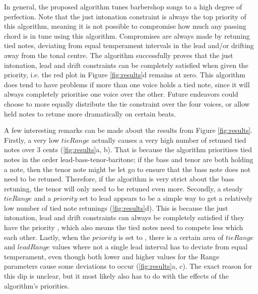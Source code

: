 \documentclass[a4paper]{article}
\begin{document}
In general, the proposed algorithm tunes barbershop songs to a high degree of perfection. Note that the just intonation constraint is always the top priority of this algorithm, meaning it is not possible to compromise how much any passing chord is in tune using this algorithm. Compromises are always made by retuning tied notes, deviating from equal temperament intervals in the lead and/or drifting away from the tonal centre. The algorithm successfully proves that the just intonation, lead and drift constraints can be completely satisfied when given the priority, i.e. the red plot in Figure \ref{fig:results}d remains at zero. This algorithm does tend to have problems if more than one voice holds a tied note, since it will always completely prioritise one voice over the other. Future endeavors could choose to more equally distribute the tie constraint over the four voices, or allow held notes to retune more dramatically on certain beats.

A few interesting remarks can be made about the results from Figure \ref{fig:results}. Firstly, a very low $\mathit{tieRange}$ actually causes a very high number of retuned tied notes over 3 cents (\ref{fig:results}a, b). That is because the algorithm prioritises tied notes in the order lead-bass-tenor-baritone; if the bass and tenor are both holding a note, then the tenor note might be let go to ensure that the bass note does not need to be retuned. Therefore, if the algorithm is very strict about the bass retuning, the tenor will only need to be retuned even more. Secondly, a steady $\mathit{tieRange}$ and a $\mathit{priority}$ set to lead appears to be a simple way to get a relatively low number of tied note retunings (\ref{fig:results}d). This is because the just intonation, lead and drift constraints can always be completely satisfied if they have the priority \cite{dougherty_choral_2004}, which also means the tied notes need to compete less which each other. Lastly, when the $\mathit{priority}$ is set to , there is a certain area of $\mathit{tieRange}$ and $\mathit{leadRange}$ values where not a single lead interval has to deviate from equal temperament, even though both lower and higher values for the Range parameters cause some deviations to occur (\ref{fig:results}a, c). The exact reason for this dip is unclear, but it most likely also has to do with the effects of the algorithm's priorities.
\end{document}
